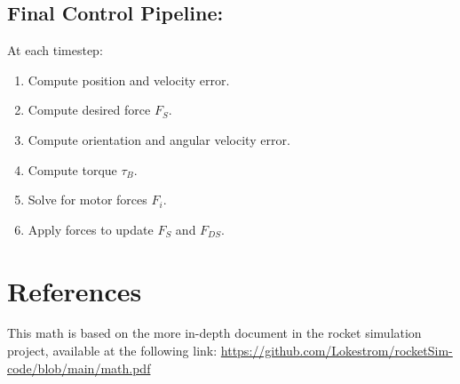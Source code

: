\documentclass{article}
\begin{document}
\subsection*{Final Control Pipeline:}

At each timestep:
\begin{enumerate}
    \item Compute position and velocity error.
    \item Compute desired force \( F_S \).
    \item Compute orientation and angular velocity error.
    \item Compute torque \( \tau_B \).
    \item Solve for motor forces \( F_i \).
    \item Apply forces to update \( F_S \) and \( F_{DS} \).
\end{enumerate}

    \section{References}
    This math is based on the more in-depth document in the rocket simulation 
    project, available at the following link:
	\url{https://github.com/Lokestrom/rocketSim-code/blob/main/math.pdf}
\end{document}
